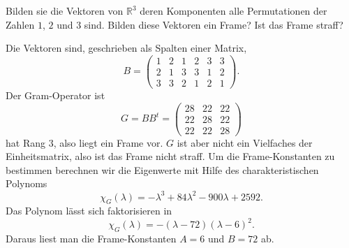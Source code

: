Bilden sie die Vektoren von $\mathbb R^3$ deren Komponenten alle Permutationen
der Zahlen $1$, $2$ und $3$ sind.
Bilden diese Vektoren ein Frame?
Ist das Frame straff?

\begin{loesung}
Die Vektoren sind, geschrieben als Spalten einer Matrix,
\[
B
=
\begin{pmatrix}
1&2&1&2&3&3\\
2&1&3&3&1&2\\
3&3&2&1&2&1
\end{pmatrix}.
\]
Der Gram-Operator ist
\[
G=BB^t
=
\begin{pmatrix}
28&22&22\\
22&28&22\\
22&22&28
\end{pmatrix}
\]
hat Rang $3$, also liegt ein Frame vor.
$G$ ist aber nicht ein Vielfaches der Einheitsmatrix, also ist das Frame
nicht straff.
Um die Frame-Konstanten zu bestimmen berechnen wir die Eigenwerte
mit Hilfe des charakteristischen Polynoms
\[
\chi_{G}(\lambda)
=
-\lambda^3 + 84\lambda^2 -900 \lambda + 2592.
\]
Das Polynom lässt sich faktorisieren in
\[
\chi_{G}(\lambda)
=
-(\lambda - 72)(\lambda - 6)^2.
\]
Daraus liest man die Frame-Konstanten $A=6$ und $B=72$ ab.
\end{loesung}

